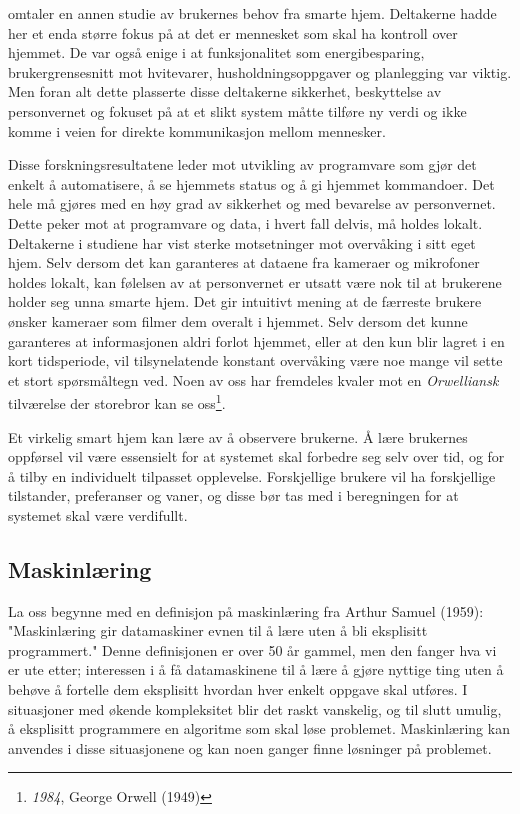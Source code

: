 \citet{userreq} omtaler en annen studie av brukernes behov fra smarte hjem. Deltakerne hadde her et enda større fokus på at det er mennesket som skal ha kontroll over hjemmet. De var også enige i at funksjonalitet som energibesparing, brukergrensesnitt mot hvitevarer, husholdningsoppgaver og planlegging var viktig. Men foran alt dette plasserte disse deltakerne sikkerhet, beskyttelse av personvernet og fokuset på at et slikt system måtte tilføre ny verdi og ikke komme i veien for direkte kommunikasjon mellom mennesker. 

Disse forskningsresultatene leder mot utvikling av programvare som gjør det enkelt å automatisere, å se hjemmets status og å gi hjemmet kommandoer. Det hele må gjøres med en høy grad av sikkerhet og med bevarelse av personvernet. Dette peker mot at programvare og data, i hvert fall delvis, må holdes lokalt. Deltakerne i studiene har vist sterke motsetninger mot overvåking i sitt eget hjem. Selv dersom det kan garanteres at dataene fra kameraer og mikrofoner holdes lokalt, kan følelsen av at personvernet er utsatt være nok til at brukerene holder seg unna smarte hjem. Det gir intuitivt mening at de færreste brukere ønsker kameraer som filmer dem overalt i hjemmet. Selv dersom det kunne garanteres at informasjonen aldri forlot hjemmet, eller at den kun blir lagret i en kort tidsperiode, vil tilsynelatende konstant overvåking være noe mange vil sette et stort spørsmåltegn ved. Noen av oss har fremdeles kvaler mot en \emph{Orwelliansk} tilværelse der storebror kan se oss\footnote{\emph{1984}, George Orwell (1949)}.

Et virkelig smart hjem kan lære av å observere brukerne. Å lære brukernes oppførsel vil være essensielt for at systemet skal forbedre seg selv over tid, og for å tilby en individuelt tilpasset opplevelse. Forskjellige brukere vil ha forskjellige tilstander, preferanser og vaner, og disse bør tas med i beregningen for at systemet skal være verdifullt.\\

\subsection{Maskinlæring}
La oss begynne med en definisjon på maskinlæring fra Arthur Samuel (1959): "Maskinlæring gir datamaskiner evnen til å lære uten å bli eksplisitt programmert." Denne definisjonen er over 50 år gammel, men den fanger hva vi er ute etter; interessen i å få datamaskinene til å lære å gjøre nyttige ting uten å behøve å fortelle dem eksplisitt hvordan hver enkelt oppgave skal utføres. I situasjoner med økende kompleksitet blir det raskt vanskelig, og til slutt umulig, å eksplisitt programmere en algoritme som skal løse problemet. Maskinlæring kan anvendes i disse situasjonene og kan noen ganger finne løsninger på problemet.

